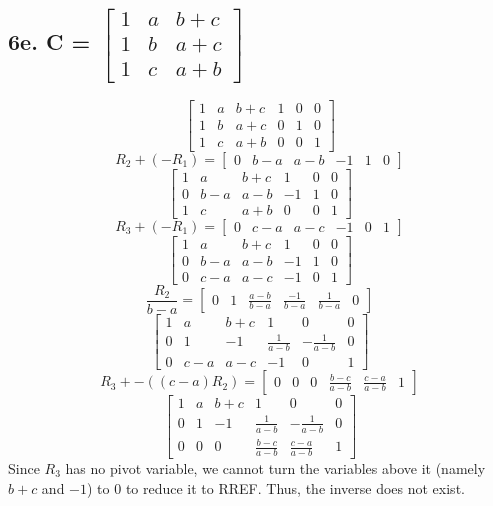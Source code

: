 \documentclass[11pt]{article}
\begin{document}
\subsection*{6e. C = \(
    \begin{bmatrix}
        1 & a & b + c \\
        1 & b & a + c \\
        1 & c & a + b
    \end{bmatrix}
    \)}
\[
    \left[
    \begin{array}{ccc|ccc}
        1 & a & b + c & 1 & 0 & 0 \\
        1 & b & a + c & 0 & 1 & 0\\
        1 & c & a + b & 0 & 0 & 1
    \end{array}
    \right]
\]
\[
    R_2 + (-R_1) = 
    \left[
    \begin{array}{ccc|ccc}
        0 & b - a & a - b & -1 & 1 & 0
    \end{array}
    \right]
\]
\[
    \left[
    \begin{array}{ccc|ccc}
        1 & a & b + c & 1 & 0 & 0 \\
        0 & b - a & a - b & -1 & 1 & 0\\
        1 & c & a + b & 0 & 0 & 1
    \end{array}
    \right]
\]
\[
    R_3 + (-R_1) = 
    \left[
    \begin{array}{ccc|ccc}
        0 & c - a & a - c & -1 & 0 & 1
    \end{array}
    \right]
\]
\[
    \left[
    \begin{array}{ccc|ccc}
        1 & a & b + c & 1 & 0 & 0 \\
        0 & b - a & a - b & -1 & 1 & 0\\
        0 & c - a & a - c & -1 & 0 & 1
    \end{array}
    \right]
\]
\[
    \frac{R_2}{b - a} = 
    \left[
    \begin{array}{ccc|ccc}
        0 & 1 & \frac{a - b}{b - a} & \frac{-1}{b - a} & \frac{1}{b - a} & 0
    \end{array}
    \right]
\]
\[
    \left[
    \begin{array}{ccc|ccc}
        1 & a & b + c & 1 & 0 & 0 \\
        0 & 1 & -1 & \frac{1}{a - b} & -\frac{1}{a - b} & 0\\
        0 & c - a & a - c & -1 & 0 & 1
    \end{array}
    \right]
\]
\[
    R_3 + -((c - a)R_2) = 
    \left[
    \begin{array}{ccc|ccc}
        0 & 0 & 0 & \frac{b - c}{a - b} & \frac{c - a}{a - b} & 1
    \end{array}
    \right]
\]
\[
    \left[
    \begin{array}{ccc|ccc}
        1 & a & b + c & 1 & 0 & 0 \\
        0 & 1 & -1 & \frac{1}{a - b} & -\frac{1}{a - b} & 0\\
        0 & 0 & 0 & \frac{b - c}{a - b} & \frac{c - a}{a - b} & 1
    \end{array}
    \right]
\]
Since \(R_3\) has no pivot variable, we cannot turn the variables above it (namely \(b + c\) and \(-1\)) to 0 to reduce it to RREF. Thus, the inverse does not exist.\pagebreak
\end{document}
